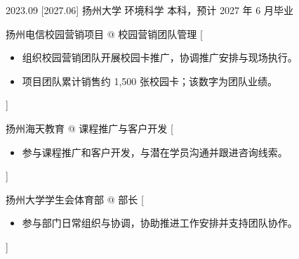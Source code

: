 \documentclass[zh]{resume}
\begin{document}
\makeheader

\begin{abstract}
扬州大学环境科学专业本科生，具备校园营销团队组织、课程推广和客户沟通实践。希望进入工业品或技术服务销售领域，结合专业学习与一线推广经历，参与客户沟通、产品介绍和业务跟进。
\end{abstract}

\begin{educations}
  \education%
    {2023.09}%
    [2027.06]%
    {扬州大学}%
    {}%
    {环境科学}%
    {本科，预计 2027 年 6 月毕业}
\end{educations}

\begin{experiences}
    {扬州电信校园营销项目 @ 校园营销团队管理}%
    [\begin{itemize}
      \item 组织校园营销团队开展校园卡推广，协调推广安排与现场执行。
      \item 项目团队累计销售约 1,500 张校园卡；该数字为团队业绩。
    \end{itemize}]

  \separator{0.5ex}
    {扬州海天教育 @ 课程推广与客户开发}%
    [\begin{itemize}
      \item 参与课程推广和客户开发，与潜在学员沟通并跟进咨询线索。
    \end{itemize}]
\end{experiences}

\begin{experiences}
    {扬州大学学生会体育部 @ 部长}%
    [\begin{itemize}
      \item 参与部门日常组织与协调，协助推进工作安排并支持团队协作。
    \end{itemize}]
\end{experiences}

\begin{competences}
\end{competences}
\end{document}
